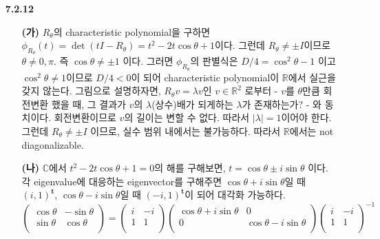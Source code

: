 \documentclass{article}
\newcommand*{\trans}{^{\mathrm{\mathbf{t}}}}%
\begin{document}
\begin{itemize}
\item[\textbf{7.2.12}]
	\begin{itemize}
		\item[\textbf{(가)}] $R_\theta$의 characteristic polynomial을 구하면 $\phi_{R_\theta}(t) = \det(tI-R_\theta) = t^2-2t\cos\theta + 1$이다. 그런데 $R_\theta \neq \pm I$이므로 $\theta \neq 0, \pi$. 즉 $\cos\theta \neq \pm 1$ 이다. 그러면 $\phi_{R_\theta}$의 판별식은 $D/4=\cos^2\theta-1$ 이고 $\cos^2\theta \neq 1$이므로 $D/4<0$이 되어 characteristic polynomial이 $\mathbb{R}$에서 실근을 갖지 않는다. 그림으로 설명하자면, $R_\theta v = \lambda v$인 $v\in \mathbb{R}^2$ 로부터 - $v$를 $\theta$만큼 회전변환 했을 때, 그 결과가 $v$의 $\lambda$(상수)배가 되게하는 $\lambda$가 존재하는가? - 와 동치이다. 회전변환이므로 $v$의 길이는 변할 수 없다. 따라서 $|\lambda| = 1$이어야 한다. 그런데 $R_\theta \neq \pm I$ 이므로, 실수 범위 내에서는 불가능하다. 따라서 $\mathbb{R}$에서는 not diagonalizable.
		\item[\textbf{(나)}] $\mathbb{C}$에서 $t^2-2t\cos\theta + 1=0$의 해를 구해보면, $t = \cos\theta \pm i\sin\theta$ 이다. 각 eigenvalue에 대응하는 eigenvector를 구해주면 $\cos\theta + i\sin\theta$일 때 $(i, 1)\trans$, $\cos\theta - i\sin\theta$일 때 $(-i, 1)\trans$이 되어 대각화 가능하다.
		$$\begin{pmatrix}
				\cos\theta & -\sin\theta\\
				\sin\theta & \cos\theta\\
				\end{pmatrix} = 
				\begin{pmatrix}
				i & -i\\
				1 & 1\\
				\end{pmatrix}
				\begin{pmatrix}
				\cos\theta+i\sin\theta & 0\\
				0 & \cos\theta-i\sin\theta\\
				\end{pmatrix}
				\begin{pmatrix}
				i & -i\\
				1 & 1\\
				\end{pmatrix}^{-1}$$
	\end{itemize}


\end{itemize}
\end{document}
